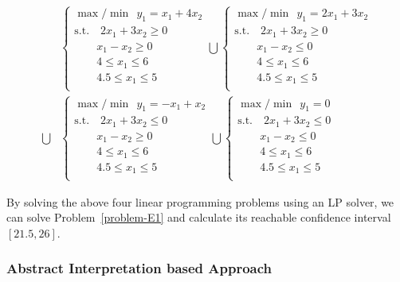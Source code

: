 \begin{equation}\label{eqn-encode}
    \begin{split}
       & \begin{cases}
        \max/\min~~y_1 = x_1 +4x_2\\
        \text{s.t.} \quad  2x_1 + 3x_2\geq 0\\
        \qquad x_1 - x_2 \geq 0\\
        \qquad 4\leq x_1 \leq 6\\
        \qquad 4.5\leq x_1 \leq 5\\
  \end{cases} 
  \bigcup  
        \begin{cases}
        \max/\min~~y_1 = 2x_1 +3x_2\\
        \text{s.t.} \quad  2x_1 + 3x_2\geq 0\\
        \qquad x_1 - x_2 \leq 0\\
        \qquad 4\leq x_1 \leq 6\\
        \qquad 4.5\leq x_1 \leq 5\\
  \end{cases}\\
  \bigcup &
  \begin{cases}
        \max/\min~~y_1 = -x_1 +x_2\\
        \text{s.t.} \quad  2x_1 + 3x_2\leq 0\\
        \qquad x_1 - x_2 \geq 0\\
        \qquad 4\leq x_1 \leq 6\\
        \qquad 4.5\leq x_1 \leq 5\\
  \end{cases}
    \bigcup
  \begin{cases}
        \max/\min~~y_1 = 0\\
        \text{s.t.} \quad  2x_1 + 3x_2\leq 0\\
        \qquad x_1 - x_2 \leq 0\\
        \qquad 4\leq x_1 \leq 6\\
        \qquad 4.5\leq x_1 \leq 5\\
  \end{cases}
    \end{split}
\end{equation}

By solving the above four linear programming problems using an LP solver, we can solve Problem~\ref{problem-E1} and calculate its reachable confidence interval $[21.5, 26]$.

\subsubsection{Abstract Interpretation based Approach}

